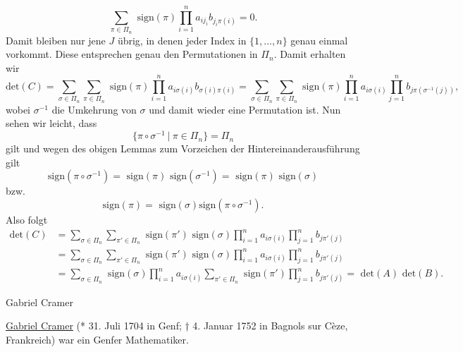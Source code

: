 \begin{emphBox}{}{}
\begin{equation*}
 \sum_{\pi \in \Pi_n} \text{ sign}(\pi)\prod_{i=1}^n  a_{ij_i} b_{j_i\pi(i)}  = 0.
\end{equation*}
Damit bleiben nur jene \(J\) übrig, in denen jeder Index in \(\{1,\ldots,n\}\) genau einmal vorkommt. Diese entsprechen genau den Permutationen in \(\Pi_n\). Damit erhalten wir
\begin{equation*}
 \text{det}(C) =  \sum_{\sigma \in \Pi_n} \sum_{\pi \in \Pi_n} \text{ sign}(\pi)\prod_{i=1}^n  a_{i\sigma(i)} b_{\sigma(i) \pi(i)} =  \sum_{\sigma \in \Pi_n} \sum_{\pi \in \Pi_n} \text{ sign}(\pi)\prod_{i=1}^n  a_{i\sigma(i)} \prod_{j=1}^n  b_{j \pi(\sigma^{-1}(j))},
\end{equation*}
wobei \(\sigma^{-1}\) die Umkehrung von \(\sigma\) und damit wieder eine Permutation ist. Nun sehen wir leicht, dass
\begin{equation*}
 \{ \pi \circ \sigma^{-1}~|~\pi \in \Pi_n\} = \Pi_n
\end{equation*}
gilt und wegen des obigen Lemmas zum Vorzeichen der Hintereinanderausführung gilt
\begin{equation*}
 \text{sign}(\pi \circ \sigma^{-1}) = \text{ sign}(\pi) \text{ sign}(\sigma^{-1}) = \text{ sign}(\pi) \text{ sign}(\sigma )\end{equation*}
bzw.
\begin{equation*}
  \text{sign}(\pi ) = \text{ sign}(\sigma)  \text{sign}(\pi \circ \sigma^{-1}).
\end{equation*}
Also folgt
\begin{align*} \text{det}(C) &=  \sum_{\sigma \in \Pi_n} \sum_{\pi' \in \Pi_n} \text{ sign}(\pi') \text{ sign}(\sigma) \prod_{i=1}^n  a_{i\sigma(i)} \prod_{j=1}^n  b_{j \pi'(j)} \\  &= \sum_{\sigma \in \Pi_n} \sum_{\pi' \in \Pi_n} \text{ sign}(\pi') \text{ sign}(\sigma) \prod_{i=1}^n  a_{i\sigma(i)} \prod_{j=1}^n  b_{j \pi'(j)}  \\  &= \sum_{\sigma \in \Pi_n} \text{ sign}(\sigma) \prod_{i=1}^n  a_{i\sigma(i)} \sum_{\pi' \in \Pi_n} \text{ sign}(\pi')   \prod_{j=1}^n  b_{j \pi'(j)}  = \text{ det}(A) \text{ det}(B). \end{align*}\end{emphBox}

\begin{emphBox}{Gabriel Cramer}{}

\href{https://de.wikipedia.org/wiki/Gabriel\_Cramer}{Gabriel Cramer} (* 31. Juli 1704 in Genf; † 4. Januar 1752 in Bagnols sur Cèze, Frankreich) war ein Genfer Mathematiker.
\end{emphBox}

